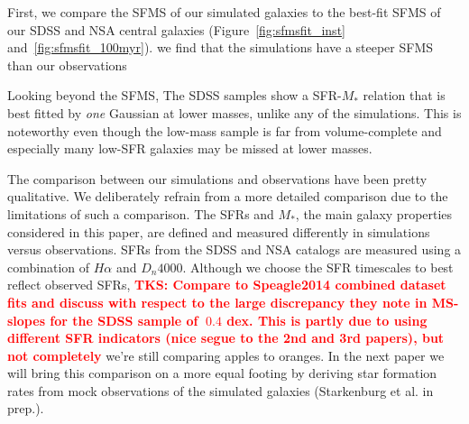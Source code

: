 \documentclass[preprint2,tighten]{aastex62}
\newcommand{\todo}[1]{{\bf \textcolor{red}{ #1}}}
\begin{document}
First, we compare the SFMS of our simulated galaxies to the best-fit SFMS
of our SDSS and NSA central galaxies
(Figure~\ref{fig:sfmsfit_inst} and~\ref{fig:sfmsfit_100myr}). 
we find that the simulations have a steeper SFMS than our observations

Looking beyond the SFMS, 
The SDSS samples show a SFR-$M_*$ relation that is best fitted by \emph{one} Gaussian at lower masses, unlike any of the simulations. This is noteworthy even though the low-mass sample is far from volume-complete and especially many low-SFR galaxies may be missed at lower masses.

The comparison between our simulations and observations have been pretty 
qualitative. We deliberately refrain from a more detailed comparison due 
to the limitations of such a comparison. The SFRs and $M_*$, the main 
galaxy properties considered in this paper, are defined and measured 
differently in simulations versus observations. SFRs from the SDSS and 
NSA catalogs are measured using a combination of $H\alpha$ and $D_n 4000$. 
Although we choose the SFR timescales to best reflect observed SFRs, 
\todo{TKS: Compare to Speagle2014 combined dataset fits and discuss with respect to the large discrepancy they note in MS-slopes for the SDSS sample of $~0.4$ dex. This is partly due to using different SFR indicators (nice segue to the 2nd and 3rd papers), but not completely}
we're still comparing apples to oranges. 
In the next paper we will bring this comparison on a more equal footing 
by deriving star formation rates from mock observations of the simulated 
galaxies (Starkenburg et al. in prep.).

\end{document}
